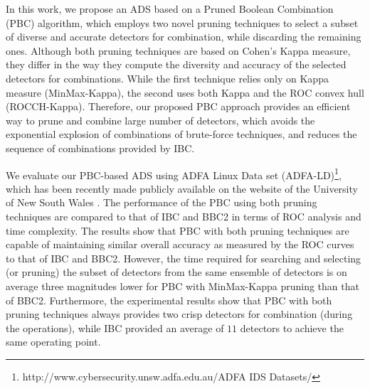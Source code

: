 In this work, we propose an ADS based on a Pruned Boolean Combination (PBC) algorithm, which employs two novel pruning techniques to select a subset of diverse and accurate detectors for combination, while discarding the remaining ones.
Although both pruning techniques are based on Cohen's Kappa \cite{Cohen1995a} measure, they differ in the way they compute the diversity and accuracy of the selected detectors for combinations.
While the first technique relies only on Kappa measure (MinMax-Kappa), the second uses both Kappa and the ROC convex hull (ROCCH-Kappa).
Therefore, our proposed PBC approach provides an efficient way to prune and combine large number of detectors, which avoids the exponential explosion of combinations of brute-force techniques, and reduces the sequence of combinations provided by IBC.

We evaluate our PBC-based ADS using ADFA Linux Data set (ADFA-LD)\footnote{http://www.cybersecurity.unsw.adfa.edu.au/ADFA IDS Datasets/}, which has been recently made publicly available on the website of the University of New South Wales \cite{Creech2013a}.
The performance of the PBC using both pruning techniques are compared to that of IBC and BBC2 in terms of ROC analysis and time complexity.
The results show that PBC with both pruning techniques are capable of maintaining similar overall accuracy as measured by the ROC curves to that of IBC and BBC2.
However, the time required for searching and selecting (or pruning) the subset of detectors from the same ensemble of detectors is on average three magnitudes lower for PBC with MinMax-Kappa pruning than that of BBC2.
Furthermore, the experimental results show that PBC with both pruning techniques always provides two crisp detectors for combination (during the operations), while IBC provided an average of $11$ detectors to achieve the same operating point.


